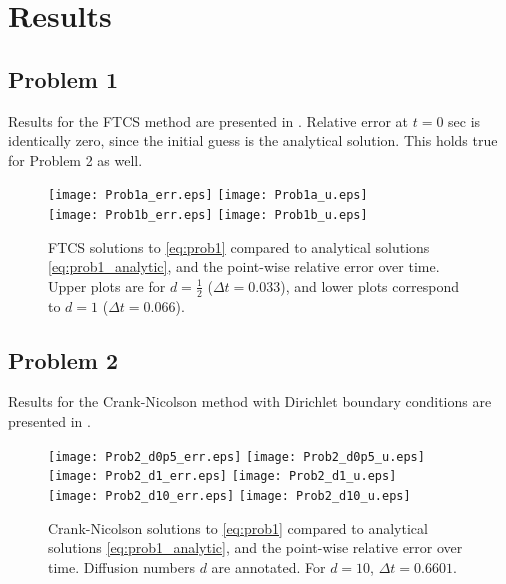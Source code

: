 \documentclass[11pt]{article}
\begin{document}
\section{Results} %

\subsection{Problem 1}

Results for the FTCS method are presented in . Relative error at $t=0$ sec is identically zero, since the initial guess is the analytical solution. This holds true for Problem 2 as well.

\begin{figure}[h!]
\begin{center}
\texttt{[image: Prob1a\_err.eps]}
\hspace*{-0.2cm}
\texttt{[image: Prob1a\_u.eps]}
\\
\texttt{[image: Prob1b\_err.eps]}
\hspace*{-0.2cm}
\texttt{[image: Prob1b\_u.eps]}
\\[-0.5cm]
\caption{FTCS solutions to \eqref{eq:prob1} compared to analytical solutions \eqref{eq:prob1_analytic}, and the point-wise relative error over time. Upper plots are for $d=\tfrac{1}{2}$ ($\Delta t = 0.033$), and lower plots correspond to $d=1$ ($\Delta t = 0.066$).}
\label{fig:Prob1}
\end{center}
\end{figure}

\subsection{Problem 2}

Results for the Crank-Nicolson method with Dirichlet boundary conditions are presented in .

\begin{figure}[h!]
\begin{center}
\texttt{[image: Prob2\_d0p5\_err.eps]}
\hspace*{-0.2cm}
\texttt{[image: Prob2\_d0p5\_u.eps]}
\\
\texttt{[image: Prob2\_d1\_err.eps]}
\hspace*{-0.2cm}
\texttt{[image: Prob2\_d1\_u.eps]}
\\
\texttt{[image: Prob2\_d10\_err.eps]}
\hspace*{-0.2cm}
\texttt{[image: Prob2\_d10\_u.eps]}
\\[-0.5cm]
\caption{Crank-Nicolson solutions to \eqref{eq:prob1} compared to analytical solutions \eqref{eq:prob1_analytic}, and the point-wise relative error over time. Diffusion numbers $d$ are annotated. For $d = 10$, $\Delta t = 0.6601$.}
\label{fig:Prob2}
\end{center}
\end{figure}
\end{document}
